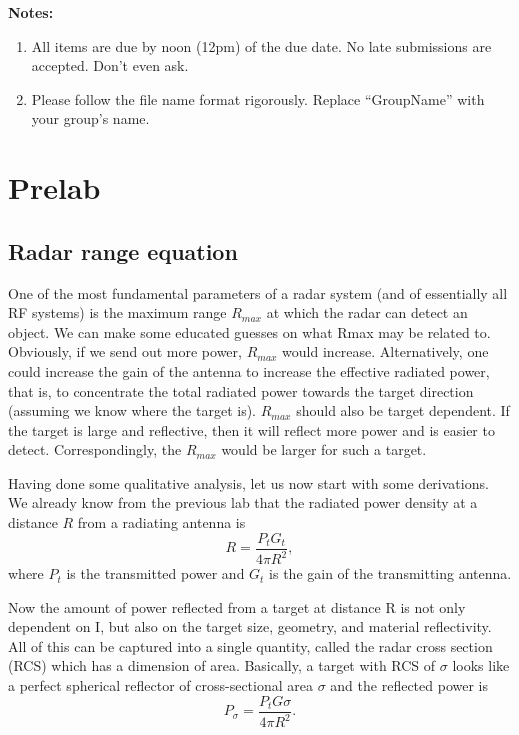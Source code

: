 \documentclass[letterpaper, 11pt]{article}
\begin{document}
\textbf{Notes:}
\begin{enumerate}
	\item All items are due by noon (12pm) of the due date. No late submissions are accepted. Don't even ask. 
	
	\item Please follow the file name format rigorously. Replace ``GroupName'' with your group's name.
\end{enumerate}

\newpage
\section{Prelab}


\subsection{Radar range equation}
One of the most fundamental parameters of a radar system (and of essentially all RF systems) is the maximum range $R_{max}$ at which the radar can detect an object. We can make some educated guesses on what Rmax may be related to. Obviously, if we send out more power, $R_{max}$ would increase. Alternatively, one could increase the gain of the antenna to increase the effective radiated power, that is, to concentrate the total radiated power towards the target direction (assuming we know where the target is). $R_{max}$ should also be target dependent. If the target is large and reflective, then it will reflect more power and is easier to detect. Correspondingly, the $R_{max}$ would be larger for such a target.

Having done some qualitative analysis, let us now start with some derivations. We already know from the previous lab that the radiated power density at a distance $R$ from a radiating antenna is 
\[
R = \frac{P_t G_t}{4\pi R^2},
\]
where $P_t$ is the transmitted power and $G_t$ is the gain of the transmitting antenna. 

Now the amount of power reflected from a target at distance R is not only dependent on I, but also on the target size, geometry, and material reflectivity. All of this can be captured into a single quantity, called the radar cross section (RCS) which has a dimension of area. Basically, a target with RCS of $\sigma$ looks like a perfect spherical reflector of cross-sectional area $\sigma$ and the reflected power is 
\[
P_{\sigma} = \frac{P_t G \sigma}{4\pi R^2}.
\]
\end{document}
